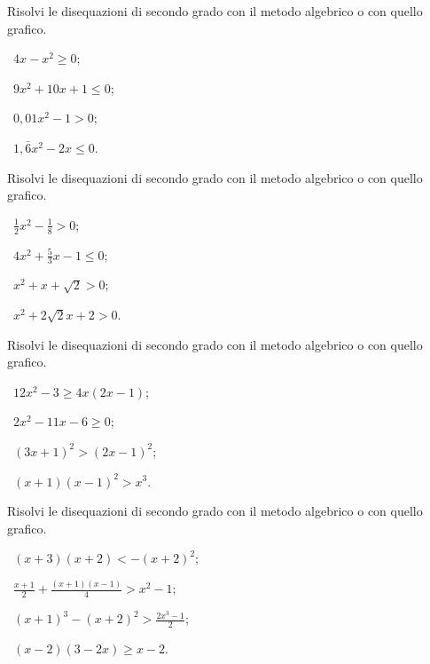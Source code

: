 \begin{esercizio}[\Ast]
 \label{ese:4.15}
Risolvi le disequazioni di secondo grado con il metodo algebrico o con quello grafico.
\begin{multicols}{2}
 \begin{enumeratea}
 \item~$4x-x^2\ge 0$;
 \item~$9x^2+10x+1\le 0$;
 \item~$0,01x^2-1>0$;
 \item~$1,\bar 6x^2-2x\le 0$.
 \end{enumeratea}
 \end{multicols}
\end{esercizio}

\begin{esercizio}[\Ast]
 \label{ese:4.16}
Risolvi le disequazioni di secondo grado con il metodo algebrico o con quello grafico.
\begin{multicols}{2}
 \begin{enumeratea}
 \item~$\frac 1 2x^2-\frac 1 8>0$;
 \item~$4x^2+\frac 5 3x-1\le 0$;
 \item~$x^2+x+\sqrt 2>0$;
 \item~$x^2+2\sqrt 2x+2>0$.
 \end{enumeratea}
 \end{multicols}
\end{esercizio}

\begin{esercizio}[\Ast]
 \label{ese:4.17}
Risolvi le disequazioni di secondo grado con il metodo algebrico o con quello grafico.
\begin{multicols}{2}
 \begin{enumeratea}
 \item~$12x^2-3\ge 4x(2x-1)$;
 \item~$2x^2-11x-6\ge 0$;
 \item~$(3x+1)^2>(2x-1)^2$;
 \item~$(x+1)(x-1)^2>x^3$.
 \end{enumeratea}
 \end{multicols}
\end{esercizio}

\begin{esercizio}[\Ast]
 \label{ese:4.18}
Risolvi le disequazioni di secondo grado con il metodo algebrico o con quello grafico.
\begin{multicols}{2}
 \begin{enumeratea}
 \item~$(x+3)(x+2)<-(x+2)^2$;
 \item~$\frac{x+1} 2+\frac{(x+1)(x-1)} 4>x^2-1$;
 \item~$(x+1)^3-(x+2)^2>\frac{2x^3-1} 2$;
 \item~$(x-2)(3-2x)\ge x-2$.
 \end{enumeratea}
 \end{multicols}
\end{esercizio}

